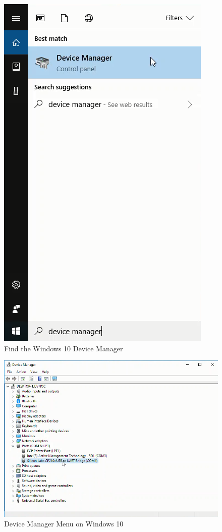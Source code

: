 \documentclass{book}
\makeatletter
\def\maxwidth{\ifdim\Gin@nat@width>\linewidth\linewidth
    \else\Gin@nat@width\fi}
\let\Oldincludegraphics\includegraphics
\renewcommand{\includegraphics}[1]{\Oldincludegraphics[width=.8\maxwidth]{#1}}
\makeatother
\begin{document}
\begin{figure}
\centering
\includegraphics{images/find_device_manager.png}
\caption{Find the Windows 10 Device Manager}
\end{figure}

\begin{figure}
\centering
\includegraphics{images/device_manager_menu.png}
\caption{Device Manager Menu on Windows 10}
\end{figure}
    
\end{document}
